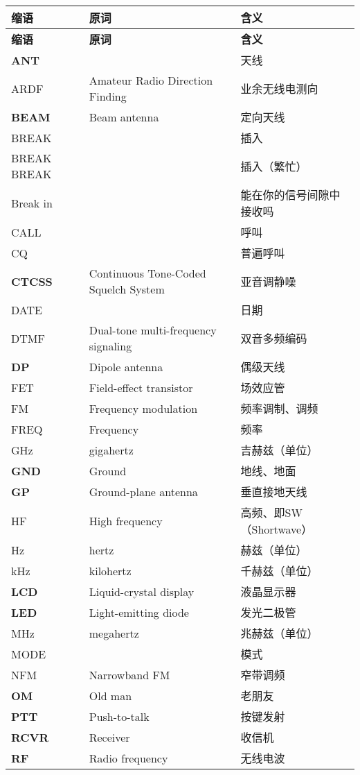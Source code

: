 \begin{longtable}[l]{lll}
	\textbf{缩语} & \textbf{原词} & \textbf{含义} \\
	\endfirsthead
	\textbf{缩语} & \textbf{原词} & \textbf{含义} \\
	\endhead
	\textbf{ANT} & & 天线 \\
	ARDF & Amateur Radio Direction Finding & 业余无线电测向 \\
	\textbf{BEAM} & Beam antenna & 定向天线 \\
	BREAK & & 插入 \\
	BREAK BREAK & & 插入（繁忙） \\
	Break in & & 能在你的信号间隙中接收吗 \\
	CALL & & 呼叫 \\
	CQ & & 普遍呼叫 \\
	\textbf{CTCSS} & Continuous Tone-Coded Squelch System & 亚音调静噪 \\
	DATE & & 日期 \\
	DTMF & Dual-tone multi-frequency signaling & 双音多频编码 \\
	\textbf{DP} & Dipole antenna & 偶级天线 \\
	FET & Field-effect transistor & 场效应管 \\
	FM & Frequency modulation & 频率调制、调频 \\
	FREQ & Frequency & 频率 \\
	GHz & gigahertz & 吉赫兹（单位） \\
	\textbf{GND} & Ground & 地线、地面 \\
	\textbf{GP} & Ground-plane antenna & 垂直接地天线 \\
	HF & High frequency & 高频、即SW（Shortwave） \\
	Hz & hertz & 赫兹（单位） \\
	kHz & kilohertz & 千赫兹（单位） \\
	\textbf{LCD} & Liquid-crystal display & 液晶显示器 \\
	\textbf{LED} & Light-emitting diode & 发光二极管 \\
	MHz & megahertz & 兆赫兹（单位） \\
	MODE & & 模式 \\
	NFM & Narrowband FM & 窄带调频 \\
	\textbf{OM} & Old man & 老朋友 \\%
	\textbf{PTT} & Push-to-talk & 按键发射 \\
	\textbf{RCVR} & Receiver & 收信机 \\
	\textbf{RF} & Radio frequency & 无线电波 \\

\end{longtable}
